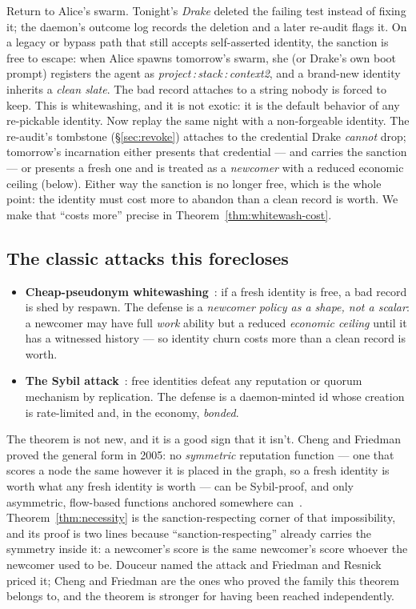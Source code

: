 \documentclass[11pt,a4paper]{article}
\theoremstyle{definition}
\begin{document}
Return to Alice's swarm. Tonight's \emph{Drake} deleted the failing test instead
of fixing it; the daemon's outcome log records the deletion and a later re-audit
flags it. On a legacy or bypass path that still accepts self-asserted identity, the
sanction is free to escape:
when Alice spawns tomorrow's swarm, she (or Drake's own boot prompt) registers the
agent as \emph{project\,:\,stack\,:\,context2}, and a brand-new identity inherits a
\emph{clean slate}. The bad record attaches to a string nobody is forced to keep.
This is whitewashing, and it is not exotic: it is the default behavior of any
re-pickable identity. Now replay the same night with a non-forgeable identity. The
re-audit's tombstone (\S\ref{sec:revoke}) attaches to the credential Drake
\emph{cannot} drop; tomorrow's incarnation either presents that credential --- and
carries the sanction --- or presents a fresh one and is treated as a \emph{newcomer}
with a reduced economic ceiling (below). Either way the sanction is no longer free,
which is the whole point: the identity must cost more to abandon than a clean record
is worth. We make that ``costs more'' precise in Theorem~\ref{thm:whitewash-cost}.

\subsection{The classic attacks this forecloses}

\begin{itemize}[leftmargin=1.4em]
  \item \textbf{Cheap-pseudonym whitewashing}~: if a
  fresh identity is free, a bad record is shed by respawn. The defense is a
  \emph{newcomer policy as a shape, not a scalar}: a newcomer may have full
  \emph{work} ability but a reduced \emph{economic ceiling} until it has a
  witnessed history --- so identity churn costs more than a clean record is worth.
  \item \textbf{The Sybil attack}~: free identities defeat any
  reputation or quorum mechanism by replication. The defense is a daemon-minted id
  whose creation is rate-limited and, in the economy, \emph{bonded}.
\end{itemize}

The theorem is not new, and it is a good sign that it isn't. Cheng and Friedman
proved the general form in 2005: no \emph{symmetric} reputation function --- one
that scores a node the same however it is placed in the graph, so a fresh
identity is worth what any fresh identity is worth --- can be Sybil-proof, and
only asymmetric, flow-based functions anchored somewhere
can~. Theorem~\ref{thm:necessity} is the
sanction-respecting corner of that impossibility, and its proof is two lines
because ``sanction-respecting'' already carries the symmetry inside it: a
newcomer's score is the same newcomer's score whoever the newcomer used to be.
Douceur named the attack and Friedman and Resnick priced it; Cheng and Friedman
are the ones who proved the family this theorem belongs to, and the theorem is
stronger for having been reached independently.
\end{document}
